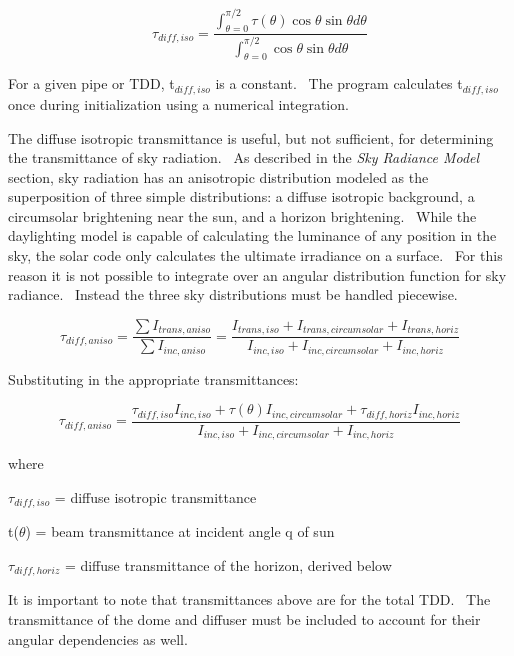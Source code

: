 \begin{equation}
{\tau_{diff,iso}} = \frac{{\int_{\theta  = 0}^{\pi /2} {\tau (\theta )\cos \theta } \sin \theta d\theta }}{{\int_{\theta  = 0}^{\pi /2} {\cos \theta } \sin \theta d\theta }}
\end{equation}

For a given pipe or TDD, t\(_{diff,iso}\) is a constant.~ The program calculates t\(_{diff,iso}\) once during initialization using a numerical integration.

The diffuse isotropic transmittance is useful, but not sufficient, for determining the transmittance of sky radiation.~ As described in the \emph{Sky Radiance Model} section, sky radiation has an anisotropic distribution modeled as the superposition of three simple distributions: a diffuse isotropic background, a circumsolar brightening near the sun, and a horizon brightening.~ While the daylighting model is capable of calculating the luminance of any position in the sky, the solar code only calculates the ultimate irradiance on a surface.~ For this reason it is not possible to integrate over an angular distribution function for sky radiance.~ Instead the three sky distributions must be handled piecewise.

\begin{equation}
{\tau_{diff,aniso}} = \frac{{\sum {{I_{trans,aniso}}} }}{{\sum {{I_{inc,aniso}}} }} = \frac{{{I_{trans,iso}} + {I_{trans,circumsolar}} + {I_{trans,horiz}}}}{{{I_{inc,iso}} + {I_{inc,circumsolar}} + {I_{inc,horiz}}}}
\end{equation}

Substituting in the appropriate transmittances:

\begin{equation}
{\tau_{diff,aniso}} = \frac{{{\tau_{diff,iso}}{I_{inc,iso}} + \tau (\theta ){I_{inc,circumsolar}} + {\tau_{diff,horiz}}{I_{inc,horiz}}}}{{{I_{inc,iso}} + {I_{inc,circumsolar}} + {I_{inc,horiz}}}}
\end{equation}

where

\(\tau_{diff,iso}\) = diffuse isotropic transmittance

t(\(\theta\)) = beam transmittance at incident angle q of sun

\(\tau_{diff,horiz}\) = diffuse transmittance of the horizon, derived below

It is important to note that transmittances above are for the total TDD.~ The transmittance of the dome and diffuser must be included to account for their angular dependencies as well.

